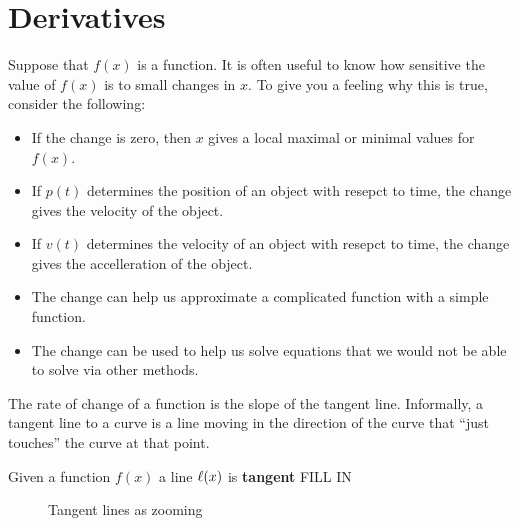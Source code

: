 \chapter{Derivatives}


Suppose that $f(x)$ is a function.  It is often useful to know how
sensitive the value of $f(x)$ is to small changes in $x$. To give you
a feeling why this is true, consider the following:
\begin{itemize}
\item If the change is zero, then $x$ gives a local maximal or minimal
  values for $f(x)$.
\item If $p(t)$ determines the position of an object with resepct to
  time, the change gives the velocity of the object.
\item If $v(t)$ determines the velocity of an object with resepct to
  time, the change gives the accelleration of the object.
\item The change can help us approximate a complicated function with a
  simple function.
\item The change can be used to help us solve equations that we would
  not be able to solve via other methods.
\end{itemize}

The rate of change of a function is the slope of the tangent line.
Informally, a tangent line to a curve is a line moving in the
direction of the curve that ``just touches'' the curve at that point.


\begin{definition}
Given a function $f(x)$ a line $\ell(x)$ is \textbf{tangent} FILL IN
\end{definition}

\begin{figure*}
\caption{Tangent lines as zooming}
\end{figure*}






